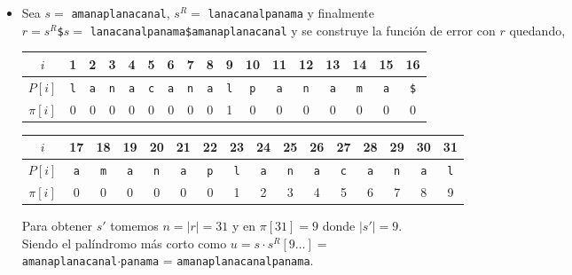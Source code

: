 \begin{itemize}
\item Sea $s = $ \texttt{amanaplanacanal}, $s^R =$ \texttt{lanacanalpanama} y finalmente\\
$r = s^R$\texttt{\$}$s =$ \texttt{lanacanalpanama\$amanaplanacanal} y se construye la función de
error con $r$ quedando,

\begin{table}[H]
\centering
\begin{tabular}{c|c|c|c|c|c|c|c|c|c|c|c|c|c|c|c|c|}
\cline{2-17}
$i$      & 1          & 2          & 3          & 4          & 5          & 6          & 7          & 8          & 9          & 10         & 11         & 12         & 13         & 14         & 15         & 16          \\ \hline
$P[i]$   & \texttt{l} & \texttt{a} & \texttt{n} & \texttt{a} & \texttt{c} & \texttt{a} & \texttt{n} & \texttt{a} & \texttt{l} & \texttt{p} & \texttt{a} & \texttt{n} & \texttt{a} & \texttt{m} & \texttt{a} & \texttt{\$} \\ \hline
$\pi[i]$ & 0          & 0          & 0          & 0          & 0          & 0          & 0          & 0          & 1          & 0          & 0          & 0          & 0          & 0          & 0          & 0           \\ \cline{2-17} 
\end{tabular}
\end{table}

\begin{table}[H]
\centering
\begin{tabular}{c|c|c|c|c|c|c|c|c|c|c|c|c|c|c|c|}
\cline{2-16}
$i$      & 17         & 18         & 19         & 20         & 21         & 22         & 23         & 24         & 25         & 26        & 27          & 28         & 29         & 30         & 31          \\ \hline
$P[i]$   & \texttt{a} & \texttt{m} & \texttt{a} & \texttt{n} & \texttt{a} & \texttt{p} & \texttt{l} & \texttt{a} & \texttt{n} & \texttt{a} & \texttt{c} & \texttt{a} & \texttt{n} & \texttt{a} & \texttt{l}  \\ \hline
$\pi[i]$ & 0          & 0          & 0          & 0          & 0          & 0          & 1          & 2          & 3          & 4          & 5          & 6          & 7          & 8          & 9           \\ \cline{2-16} 
\end{tabular}
\end{table}
Para obtener $s'$ tomemos $n = \vert r \vert = 31$ y en $\pi[31] = 9$ donde $\vert s' \vert = 9$.\\
Siendo el palíndromo más corto como $u = s \cdot s^R[9 \ldots] =$\\
\texttt{amanaplanacanal}$\cdot$\texttt{panama} = \texttt{amanaplanacanalpanama}.


\end{itemize}
